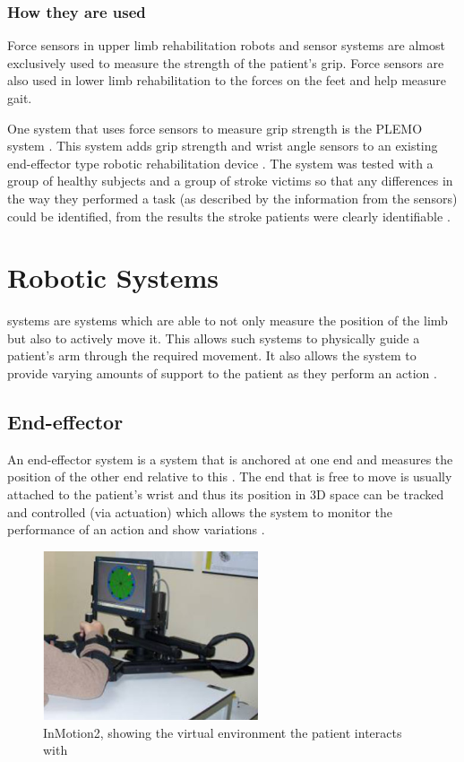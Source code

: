 \documentclass[journal]{IEEEtran}
\begin{document}
\subsubsection{How they are used}
Force sensors in upper limb rehabilitation robots and sensor systems are almost exclusively 
used to measure the strength of the patient's grip. Force sensors are also used in lower 
limb rehabilitation to the forces on the feet and help measure gait.

One system that uses force sensors to measure grip strength is the PLEMO system \cite{PLEMO}. 
This system adds grip strength and wrist angle sensors to an existing end-effector type 
robotic rehabilitation device \cite{PLEMO}. The system was tested with a group of healthy subjects 
and a group of stroke victims so that any differences in the way they performed a task 
(as described by the information from the sensors) could be identified, from the results 
the stroke patients were clearly identifiable \cite{PLEMO}.


\section{Robotic Systems}
 systems are systems which are able to not only measure the position 
of the limb but also to actively move it. This allows such systems to physically guide a patient's 
arm through the required movement. It also allows the system to provide varying amounts of 
support to the patient as they perform an action \cite{AdvancesPush}.

\subsection{End-effector}
An end-effector system is a system that is anchored at one end and measures the position of 
the other end relative to this \cite{AdvancesPush}. The end that is free to move is usually attached to the 
patient's wrist and thus its position in 3D space can be tracked and controlled (via actuation) 
which allows the system to monitor the performance of an action and show variations \cite{AdvancesPush}.

\begin{figure}[!h]
\centering
\includegraphics[width=2.5in]{InMotion2.png}
\caption{InMotion2, showing the virtual environment the patient interacts with \cite{QuantativeRobot}}
\label{InMotion2_fig}
\end{figure}
\end{document}
